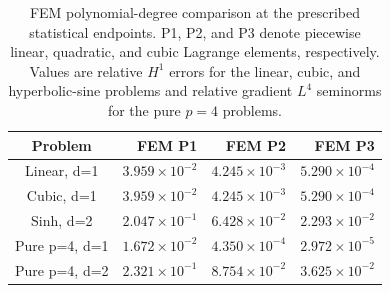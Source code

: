 \begin{table}[htbp]
\centering\small
\caption{FEM polynomial-degree comparison at the prescribed statistical endpoints. P1, P2, and P3 denote piecewise linear, quadratic, and cubic Lagrange elements, respectively. Values are relative $H^1$ errors for the linear, cubic, and hyperbolic-sine problems and relative gradient $L^4$ seminorms for the pure \(p=4\) problems.}
\label{tab:p-degree-sensitivity}
\begin{tabular}{@{}crrr@{}}
\toprule
Problem & FEM P1 & FEM P2 & FEM P3 \\ \midrule
Linear, d=1 & $3.959\!\times\!10^{-2}$ & $4.245\!\times\!10^{-3}$ & $5.290\!\times\!10^{-4}$ \\
Cubic, d=1 & $3.959\!\times\!10^{-2}$ & $4.245\!\times\!10^{-3}$ & $5.290\!\times\!10^{-4}$ \\
Sinh, d=2 & $2.047\!\times\!10^{-1}$ & $6.428\!\times\!10^{-2}$ & $2.293\!\times\!10^{-2}$ \\
Pure p=4, d=1 & $1.672\!\times\!10^{-2}$ & $4.350\!\times\!10^{-4}$ & $2.972\!\times\!10^{-5}$ \\
Pure p=4, d=2 & $2.321\!\times\!10^{-1}$ & $8.754\!\times\!10^{-2}$ & $3.625\!\times\!10^{-2}$ \\
\bottomrule
\end{tabular}
\end{table}
